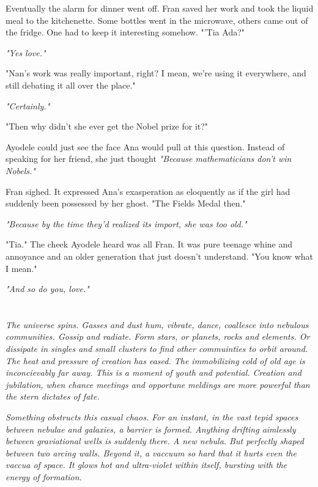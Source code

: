 \documentclass{article}
\begin{document}
Eventually the alarm for dinner went off. Fran saved her work and took the liquid meal to the kitchenette. Some bottles went in the microwave, others came out of the fridge. One had to keep it interesting somehow. "'Tia Ada?"

\emph{"Yes love."}

"Nan's work was really important, right? I mean, we're using it everywhere, and still debating it all over the place."

\emph{"Certainly."}

"Then why didn't she ever get the Nobel prize for it?"

Ayodele could just see the face Ana would pull at this question. Instead of speaking for her friend, she just thought \emph{"Because mathematicians don't win Nobels."}

Fran sighed. It expressed Ana's exasperation as eloquently as if the girl had suddenly been possessed by her ghost. "The Fields Medal then." 

\emph{"Because by the time they'd realized its import, she was too old."}

"Tia." The cheek Ayodele heard was all Fran. It was pure teenage whine and annoyance and an older generation that just doesn't understand. "You know what I mean."

\emph{"And so do you, love."}

\section{}
\emph{The universe spins. Gasses and dust hum, vibrate, dance, coallesce into nebulous communities. Gossip and radiate. Form stars, or planets, rocks and elements. Or dissipate in singles and small clusters to find other commuinties to orbit around. The heat and pressure of creation has eased. The immobilizing cold of old age is inconcievably far away. This is a moment of youth and potential. Creation and jubilation, when chance meetings and opportune meldings are more powerful than the stern dictates of fate. }

\emph{Something obstructs this casual chaos. For an instant, in the vast tepid spaces between nebulae and galaxies, a barrier is formed. Anything drifting aimlessly between graviational wells is suddenly there. A new nebula. But perfectly shaped between two arcing walls. Beyond it, a vaccuum so hard that it hurts even the vaccua of space. It glows hot and ultra-violet within itself, bursting with the energy of formation. }
\end{document}
